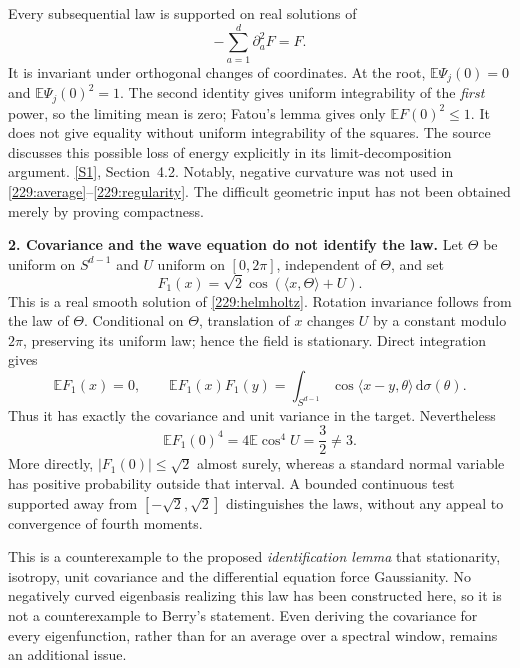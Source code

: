\documentclass[11pt,a4paper]{article}
\newcommand{\E}{\mathbb{E}}
\newcommand{\dd}{\,\mathrm d}
\newcommand{\sref}[2]{\hyperlink{source:#1:#2}{[S#2]}}
\numberwithin{equation}{section}
\begin{document}
Every subsequential law is supported on real solutions of
\begin{equation}\label{229:helmholtz}
 -\sum_{a=1}^d\partial_a^2F=F.
\end{equation}
It is invariant under orthogonal changes of coordinates. At the root,
$\E\Psi_j(0)=0$ and $\E\Psi_j(0)^2=1$. The second identity gives uniform
integrability of the \emph{first} power, so the limiting mean is zero;
Fatou's lemma gives only $\E F(0)^2\leq1$. It does not give equality
without uniform integrability of the squares. The source discusses this
possible loss of energy explicitly in its limit-decomposition argument.
\sref{229}{1}, Section~4.2. Notably, negative curvature was not used in
\eqref{229:average}--\eqref{229:regularity}. The difficult geometric input
has not been obtained merely by proving compactness.

\textbf{2. Covariance and the wave equation do not identify the law.}
Let $\Theta$ be uniform on $S^{d-1}$ and $U$ uniform on $[0,2\pi]$,
independent of $\Theta$, and set
\begin{equation}\label{229:onewave}
 F_1(x)=\sqrt2\cos(\langle x,\Theta\rangle+U).
\end{equation}
This is a real smooth solution of \eqref{229:helmholtz}. Rotation
invariance follows from the law of $\Theta$. Conditional on $\Theta$,
translation of $x$ changes $U$ by a constant modulo $2\pi$, preserving its
uniform law; hence the field is stationary. Direct integration gives
\[
 \E F_1(x)=0,\qquad
 \E F_1(x)F_1(y)=\int_{S^{d-1}}
       \cos\langle x-y,\theta\rangle\dd\sigma(\theta).
\]
Thus it has exactly the covariance and unit variance in the target.
Nevertheless
\begin{equation}\label{229:fourth}
 \E F_1(0)^4=4\E\cos^4U=\frac32\ne3.
\end{equation}
More directly, $|F_1(0)|\leq\sqrt2$ almost surely, whereas a standard
normal variable has positive probability outside that interval. A bounded
continuous test supported away from $[-\sqrt2,\sqrt2]$ distinguishes the
laws, without any appeal to convergence of fourth moments.

This is a counterexample to the proposed \emph{identification lemma}
that stationarity, isotropy, unit covariance and the differential equation
force Gaussianity. No negatively curved eigenbasis realizing this law has
been constructed here, so it is not a counterexample to Berry's statement.
Even deriving the covariance for every eigenfunction, rather than for an
average over a spectral window, remains an additional issue.
\end{document}

